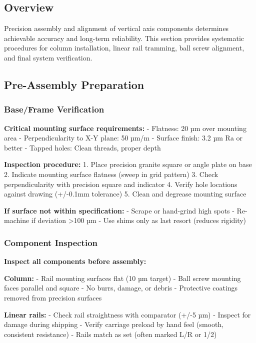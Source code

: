 \documentclass[
]{article}
\begin{document}
\subsection{Overview}\label{overview}

Precision assembly and alignment of vertical axis components determines
achievable accuracy and long-term reliability. This section provides
systematic procedures for column installation, linear rail tramming,
ball screw alignment, and final system verification.

\subsection{Pre-Assembly Preparation}\label{pre-assembly-preparation}

\subsubsection{Base/Frame Verification}\label{baseframe-verification}

\textbf{Critical mounting surface requirements:} - Flatness: 20 µm over
mounting area - Perpendicularity to X-Y plane: 50 µm/m - Surface finish:
3.2 µm Ra or better - Tapped holes: Clean threads, proper depth

\textbf{Inspection procedure:} 1. Place precision granite square or
angle plate on base 2. Indicate mounting surface flatness (sweep in grid
pattern) 3. Check perpendicularity with precision square and indicator
4. Verify hole locations against drawing (+/-0.1mm tolerance) 5. Clean
and degrease mounting surface

\textbf{If surface not within specification:} - Scrape or hand-grind
high spots - Re-machine if deviation \textgreater100 µm - Use shims only
as last resort (reduces rigidity)

\subsubsection{Component Inspection}\label{component-inspection}

\textbf{Inspect all components before assembly:}

\textbf{Column:} - Rail mounting surfaces flat (10 µm target) - Ball
screw mounting faces parallel and square - No burrs, damage, or debris -
Protective coatings removed from precision surfaces

\textbf{Linear rails:} - Check rail straightness with comparator (+/-5
µm) - Inspect for damage during shipping - Verify carriage preload by
hand feel (smooth, consistent resistance) - Rails match as set (often
marked L/R or 1/2)
\end{document}
